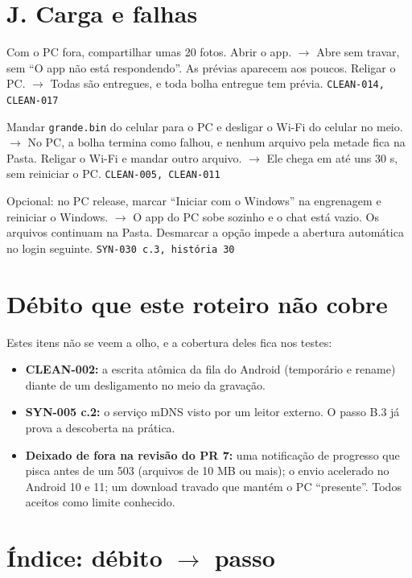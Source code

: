 \documentclass[11pt,a4paper]{article}
\newcommand{\letra}{P}
\newcommand{\secao}[2]{\renewcommand{\letra}{#1}\section*{#1. #2}\addcontentsline{toc}{section}{#1. #2}}
\newcommand{\fonte}[1]{\hfill{\small\color{fonte}\texttt{#1}}}
\begin{document}
\secao{J}{Carga e falhas}

\begin{passos}
  \item Com o PC fora, compartilhar umas 20 fotos. Abrir o app.
        $\rightarrow$ Abre sem travar, sem ``O app não está respondendo''. As
        prévias aparecem aos poucos. Religar o PC. $\rightarrow$ Todas são
        entregues, e toda bolha entregue tem prévia. \fonte{CLEAN-014,
        CLEAN-017}
  \item Mandar \texttt{grande.bin} do celular para o PC e desligar o Wi-Fi do
        celular no meio. $\rightarrow$ No PC, a bolha termina como falhou, e
        nenhum arquivo pela metade fica na Pasta. Religar o Wi-Fi e mandar
        outro arquivo. $\rightarrow$ Ele chega em até uns 30 s, sem reiniciar
        o PC. \fonte{CLEAN-005, CLEAN-011}
  \item Opcional: no PC release, marcar ``Iniciar com o Windows'' na
        engrenagem e reiniciar o Windows. $\rightarrow$ O app do PC sobe sozinho
        e o chat está vazio. Os arquivos continuam na Pasta. Desmarcar a opção
        impede a abertura automática no login seguinte.
        \fonte{SYN-030 c.3, história 30}
\end{passos}

\section*{Débito que este roteiro não cobre}

Estes itens não se veem a olho, e a cobertura deles fica nos testes:
\begin{itemize}
  \item \textbf{CLEAN-002:} a escrita atômica da fila do Android (temporário
        e rename) diante de um desligamento no meio da gravação.
  \item \textbf{SYN-005 c.2:} o serviço mDNS visto por um leitor externo. O
        passo B.3 já prova a descoberta na prática.
  \item \textbf{Deixado de fora na revisão do PR 7:} uma notificação de
        progresso que pisca antes de um 503 (arquivos de 10 MB ou mais); o
        envio acelerado no Android 10 e 11; um download travado que mantém o
        PC ``presente''. Todos aceitos como limite conhecido.
\end{itemize}

\section*{Índice: débito $\rightarrow$ passo}
\end{document}
